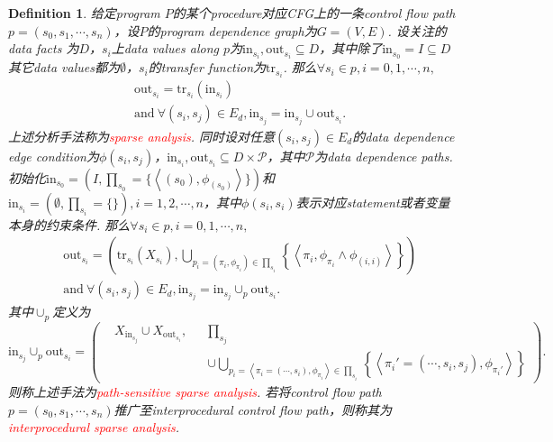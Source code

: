 \documentclass{article}
\newtheorem{definition}[theorem]{Definition}
\newcommand{\redt}[1]{\textcolor{red}{#1}}
\newcommand{\abracket}[1]{\ensuremath{\left< #1 \right>}}
\begin{document}
\newpage
\begin{definition}
\rm 给定program $P$的某个procedure对应CFG上的一条control flow path  $p = (s_0, s_1,\cdots, s_n)$，设$P$的program dependence graph为$G = (V,E)$. 设关注的data facts 为$D$，$s_i$上data values along $p$为$\text{in}_{s_i},\text{out}_{s_i} \subseteq D$，其中除了$\text{in}_{s_0} = I \subseteq D$其它data values都为$\emptyset$，$s_i$的transfer function为$\text{tr}_{s_i}$. 那么$\forall s_i \in p, i=0,1,\cdots,n,$
$$
\begin{aligned}
&\text{out}_{s_i} = \text{tr}_{s_i}(\text{in}_{s_i}) \\
&\text{and}~\forall (s_i,s_j) \in E_d,  \text{in}_{s_j} = \text{in}_{s_j} \cup \text{out}_{s_i}. 
\end{aligned}
$$
上述分析手法称为\redt{sparse analysis}. 同时设对任意$(s_i,s_j)\in E_d$的data dependence edge condition为$\phi(s_i,s_j)$，$\text{in}_{s_i},\text{out}_{s_i} \subseteq D \times \mathcal{P}$，其中$\mathcal{P}$为data dependence paths. 初始化$\text{in}_{s_0} = (I,\prod_{s_0} = \{\abracket{(s_0),\phi_{(s_0)}}\})$和$\text{in}_{s_i} = (\emptyset,\prod_{s_i}=\{\}),i=1,2,\cdots,n$，其中$\phi(s_i,s_i)$表示对应statement或者变量本身的约束条件. 那么$\forall s_i \in p, i=0,1,\cdots,n,$
$$
\begin{aligned}
&\text{out}_{s_i} = \left(\text{tr}_{s_i}(X_{s_i}),\bigcup\limits_{p_{i} = (\pi_i,\phi_{\pi_i}) \in \prod_{s_i}}\left\{\abracket{\pi_i,\phi_{\pi_i} \wedge \phi_{(i,i)}}\right\}\right) \\
&\text{and}~\forall (s_i,s_j) \in E_d,  \text{in}_{s_j} = \text{in}_{s_j} \cup_p \text{out}_{s_i}.
\end{aligned}
$$
其中$\cup_p$定义为
$$
\text{in}_{s_j} \cup_p \text{out}_{s_i} =   
\left(\begin{aligned}
&X_{\text{in}_{s_j}} \cup X_{\text{out}_{s_i}}, && \prod_{s_j} \\
&&&\cup \bigcup_{p_i = \abracket{\pi_i=(\cdots,s_i),\phi_{\pi_i}} \in \prod_{s_i}} \left\{\abracket{\pi_i'=(\cdots,s_i,s_j), \phi_{\pi_{i}'}}\right\}
\end{aligned}\right).
$$
则称上述手法为\redt{path-sensitive sparse analysis}. 若将control flow path $p=(s_0,s_1,\cdots,s_n)$推广至interprocedural control flow path，则称其为\redt{interprocedural sparse analysis}. 
\end{definition}
\end{document}
